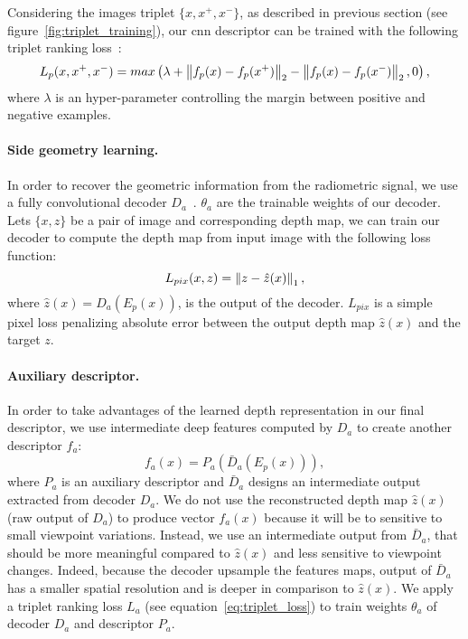Considering the images triplet $\{x, x^+, x^-\}$, as described in previous section (see figure~\ref{fig:triplet_training}), our \ac{cnn} descriptor can be trained with the following triplet ranking loss~\citep{Arandjelovic2017}:
\begin{equation}
	\label{eq:triplet_loss}
	L_p(x, x^+, x^-) = max\left(\lambda + \left\lVert f_p(x) - f_p(x^+)\right\rVert_2 - \left\lVert f_p(x) - f_p(x^-)\right\rVert_2, 0 \right),
\end{equation}
where $\lambda$ is an hyper-parameter controlling the margin between positive and negative examples.

\paragraph{Side geometry learning.}
In order to recover the geometric information from the radiometric signal, we use a fully convolutional decoder $D_a$~\citep{Eigen2014}. $\theta_{a}$ are the trainable weights of our decoder. Lets $\{x, z\}$ be a pair of image and corresponding depth map, we can train our decoder to compute the depth map from input image with the following loss function:
\begin{equation}
	\label{eq:l1_loss}
    L_{pix}(x,z) = \left\lVert z - \hat{z}(x)\right\rVert_{1},
\end{equation}
where $\hat{z}(x) = D_a(E_p(x))$, is the output of the decoder. $L_{pix}$ is a simple pixel loss penalizing absolute error between the output depth map $\hat{z}(x)$ and the target $z$.

\paragraph{Auxiliary descriptor.}
In order to take advantages of the learned depth representation in our final descriptor, we use intermediate deep features computed by $D_a$ to create another descriptor $f_a$:
\begin{equation}
	\label{eq:desc_aux}
	f_a(x) = P_a(\bar{D}_a(E_p(x))),
\end{equation}
where $P_a$ is an auxiliary descriptor and $\bar{D}_a$ designs an intermediate output extracted from decoder $D_a$. We do not use the reconstructed depth map $\hat{z}(x)$ (\ie raw output of $D_a$) to produce vector $f_a(x)$ because it will be to sensitive to small viewpoint variations. Instead, we use an intermediate output from $\bar{D}_a$, that should be more meaningful compared to  $\hat{z}(x)$ and less sensitive to viewpoint changes. Indeed, because the decoder upsample the features maps, output of $\bar{D}_a$ has a smaller spatial resolution and is deeper in comparison to $\hat{z}(x)$. We apply a triplet ranking loss $L_a$ (see equation~\ref{eq:triplet_loss}) to train weights $\theta_{a}$ of decoder $D_a$ and descriptor $P_a$. 

